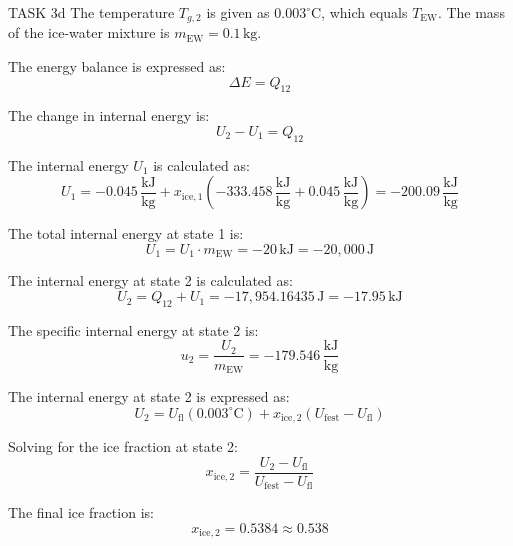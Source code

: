 TASK 3d  
The temperature \( T_{g,2} \) is given as \( 0.003^\circ \text{C} \), which equals \( T_{\text{EW}} \). The mass of the ice-water mixture is \( m_{\text{EW}} = 0.1 \, \text{kg} \).  

The energy balance is expressed as:  
\[
\Delta E = Q_{12}
\]  

The change in internal energy is:  
\[
U_2 - U_1 = Q_{12}
\]  

The internal energy \( U_1 \) is calculated as:  
\[
U_1 = -0.045 \, \frac{\text{kJ}}{\text{kg}} + x_{\text{ice},1} \left( -333.458 \, \frac{\text{kJ}}{\text{kg}} + 0.045 \, \frac{\text{kJ}}{\text{kg}} \right) = -200.09 \, \frac{\text{kJ}}{\text{kg}}
\]  

The total internal energy at state 1 is:  
\[
U_1 = U_1 \cdot m_{\text{EW}} = -20 \, \text{kJ} = -20,000 \, \text{J}
\]  

The internal energy at state 2 is calculated as:  
\[
U_2 = Q_{12} + U_1 = -17,954.16435 \, \text{J} = -17.95 \, \text{kJ}
\]  

The specific internal energy at state 2 is:  
\[
u_2 = \frac{U_2}{m_{\text{EW}}} = -179.546 \, \frac{\text{kJ}}{\text{kg}}
\]  

The internal energy at state 2 is expressed as:  
\[
U_2 = U_{\text{fl}} (0.003^\circ \text{C}) + x_{\text{ice},2} \left( U_{\text{fest}} - U_{\text{fl}} \right)
\]  

Solving for the ice fraction at state 2:  
\[
x_{\text{ice},2} = \frac{U_2 - U_{\text{fl}}}{U_{\text{fest}} - U_{\text{fl}}}
\]  

The final ice fraction is:  
\[
x_{\text{ice},2} = 0.5384 \approx 0.538
\]